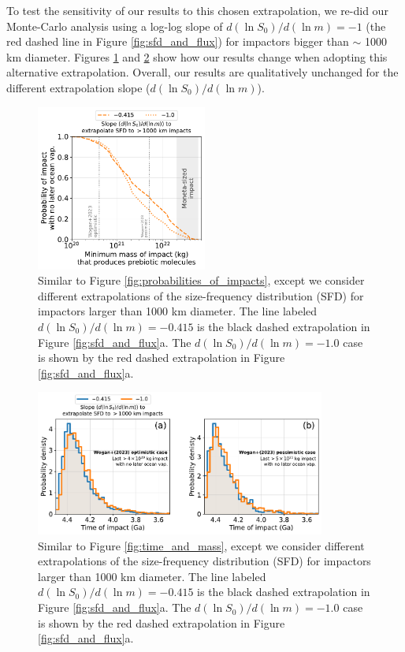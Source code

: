 \documentclass[manuscript]{aastex63}
\begin{document}
To test the sensitivity of our results to this chosen extrapolation, we re-did our Monte-Carlo analysis using a log-log slope of $d (\ln S_0)/d (\ln m) = - 1$ (the red dashed line in Figure \ref{fig:sfd_and_flux}) for impactors bigger than $\sim$ 1000 km diameter. Figures \ref{fig:probabilities_of_impacts_extrapolation_sens} and \ref{fig:timing_extrapolation_sensitivity} show how our results change when adopting this alternative extrapolation. Overall, our results are qualitatively unchanged for the different extrapolation slope ($d (\ln S_0)/d (\ln m)$).

\begin{figure}
  \centering
  \includegraphics[width=0.5\textwidth]{figures/probabilities_of_impacts_extrapolation_sens.pdf}
  \caption{Similar to Figure \ref{fig:probabilities_of_impacts}, except we consider different extrapolations of the size-frequency distribution (SFD) for impactors larger than 1000 km diameter. The line labeled $d (\ln S_0)/d (\ln m) = - 0.415$ is the black dashed extrapolation in Figure \ref{fig:sfd_and_flux}a. The $d (\ln S_0)/d (\ln m) = - 1.0$ case is shown by the red dashed extrapolation in Figure \ref{fig:sfd_and_flux}a.}
  \label{fig:probabilities_of_impacts_extrapolation_sens}
\end{figure}

\begin{figure}
  \centering
  \includegraphics[width=0.85\textwidth]{figures/timing_extrapolation_sensitivity.pdf}
  \caption{Similar to Figure \ref{fig:time_and_mass}, except we consider different extrapolations of the size-frequency distribution (SFD) for impactors larger than 1000 km diameter. The line labeled $d (\ln S_0)/d (\ln m) = - 0.415$ is the black dashed extrapolation in Figure \ref{fig:sfd_and_flux}a. The $d (\ln S_0)/d (\ln m) = - 1.0$ case is shown by the red dashed extrapolation in Figure \ref{fig:sfd_and_flux}a.}
  \label{fig:timing_extrapolation_sensitivity}
\end{figure}
\end{document}
